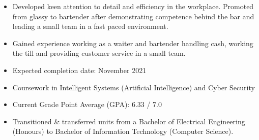\documentclass[10pt, a4paper]{altacv}
\begin{document}
    	\divider
        \begin{itemize}
            \item Developed keen attention to detail and efficiency in the workplace. Promoted from glassy to bartender after demonstrating competence behind the bar and leading a small team in a fast paced environment.
        \end{itemize}
    	\divider
        \begin{itemize}
            \item Gained experience working as a waiter and bartender handling cash, working the till and
providing customer service in a small team.
        \end{itemize}
	\begin{itemize}
		\item Expected completion date: November 2021
		\item Coursework in Intelligent Systems (Artificial Intelligence) and Cyber Security
		\item Current Grade Point Average (GPA): 6.33 / 7.0
		\item Transitioned \& transferred units from a Bachelor of Electrical Engineering (Honours) to Bachelor of Information Technology (Computer Science).
	\end{itemize}
    \medskip
\end{document}

